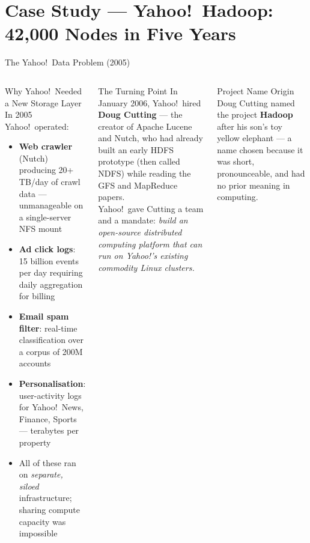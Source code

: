 \documentclass[aspectratio=169,10pt]{beamer}
\begin{document}
\section{Case Study — Yahoo!\ Hadoop: 42{,}000 Nodes in Five Years}

\begin{frame}{The Yahoo!\ Data Problem (2005)}
  \begin{columns}[T]
      \begin{block}{Why Yahoo!\ Needed a New Storage Layer}
        In 2005 Yahoo!\ operated:
        \begin{itemize}
          \item \textbf{Web crawler} (Nutch) producing 20+ TB/day of
                crawl data — unmanageable on a single-server NFS mount
          \item \textbf{Ad click logs}: 15 billion events per day
                requiring daily aggregation for billing
          \item \textbf{Email spam filter}: real-time classification
                over a corpus of 200M accounts
          \item \textbf{Personalisation}: user-activity logs for
                Yahoo!\ News, Finance, Sports — terabytes per property
          \item All of these ran on \emph{separate, siloed} infrastructure;
                sharing compute capacity was impossible
        \end{itemize}
      \end{block}

      \begin{alertblock}{The Turning Point}
        In January 2006, Yahoo!\ hired
        \textbf{Doug Cutting} — the creator of Apache Lucene and
        Nutch, who had already built an early HDFS prototype
        (then called NDFS) while reading the GFS and MapReduce papers.\\[5pt]
        Yahoo!\ gave Cutting a team and a mandate:
        \emph{build an open-source distributed computing platform
        that can run on Yahoo!'s existing commodity Linux clusters.}
      \end{alertblock}
      \vspace{5pt}
      \begin{exampleblock}{Project Name Origin}
        Doug Cutting named the project \textbf{Hadoop} after his
        son's toy yellow elephant — a name chosen because it was
        short, pronounceable, and had no prior meaning in computing.
      \end{exampleblock}
  \end{columns}
\end{frame}
\end{document}
